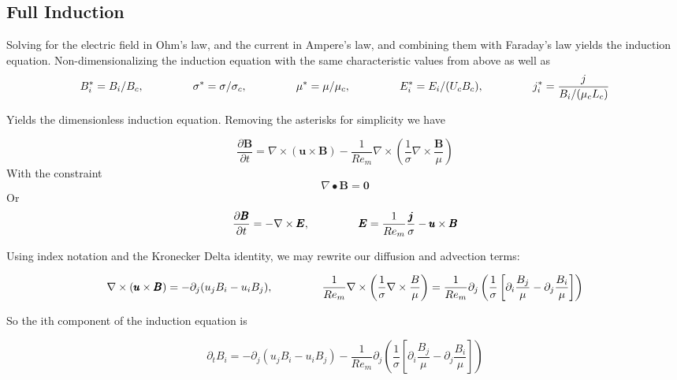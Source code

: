 \subsection{Full Induction}
Solving for the electric field in Ohm's law, and the current in Ampere's law, and combining them with Faraday's law yields the induction equation. Non-dimensionalizing the induction equation with the same characteristic values from above as well as
\begin{equation*}
B_i^* = B_i/B_c  ,\;\;\;\;\;\;\;\;\;\;\;\;\;\;\;\;
\sigma^* = \sigma/\sigma_c ,\;\;\;\;\;\;\;\;\;\;\;\;\;\;\;\;
\mu^* = \mu/\mu_c ,\;\;\;\;\;\;\;\;\;\;\;\;\;\;\;\;
E_i^* = E_i/(U_c B_c) ,\;\;\;\;\;\;\;\;\;\;\;\;\;\;\;\;
j_i^* = \frac{j}{B_i/(\mu_c L_c)}
\end{equation*}

Yields the dimensionless induction equation. Removing the asterisks for simplicity we have

\begin{equation} \label{eq:fullInduction}
\frac{\partial \pmb{B}}{\partial t} =
 \nabla \times (\pmb{u} \times \pmb{B})
- \frac{1}{Re_m} \nabla \times \left( \frac{1}{\sigma} \nabla \times \frac{\pmb{B}}{\mu} \right)
\end{equation}
With the constraint
\begin{equation} \label{eq:divB}
\nabla \bullet \pmb{B} = \pmb{0}
\end{equation}
Or
\begin{equation} \label{eq:Faraday}
\frac{\partial \pmb{B}}{\partial t} =
 - \nabla \times \pmb{E}
, \;\;\;\;\;\;\;\;\;\;\;\;\;\;\;\;
 \pmb{E} = \frac{1}{Re_m} \frac{\pmb{j}}{\sigma} - \pmb{u} \times \pmb{B}
\end{equation}

Using index notation and the Kronecker Delta identity, we may rewrite our diffusion and advection terms:

\begin{equation*}
\nabla \times (\pmb{u} \times \pmb{B}) = -\partial_j (u_j B_i - u_i B_j), \;\;\;\;\;\;\;\;\;\;\;\;\;\;\;\;
\frac{1}{Re_m} \nabla \times \left( \frac{1}{\sigma} \nabla \times \frac{B}{\mu} \right) = 
\frac{1}{Re_m} \partial_j \left( \frac{1}{\sigma} \left[ \partial_i \frac{B_j}{\mu} - \partial_j \frac{B_i}{\mu} \right] \right)
\end{equation*}

So the ith component of the induction equation is

\begin{equation} \label{eq:conservativeFormulation}
 \partial_t B_i = 
-\partial_j (u_j B_i - u_i B_j)
-\frac{1}{Re_m} \partial_j \left( \frac{1}{\sigma} \left[ \partial_i \frac{B_j}{\mu} - \partial_j \frac{B_i}{\mu} \right] \right)
\end{equation}

